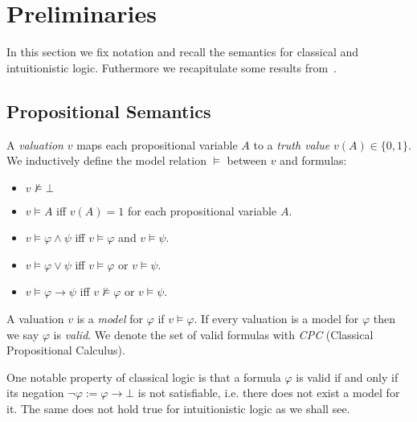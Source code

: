 \documentclass[runningheads]{llncs}
\begin{document}
\section{Preliminaries}

In this section we fix notation and recall the semantics for classical and intuitionistic logic. Futhermore we recapitulate some results from~\cite{otten2005clausal}.

\subsection{Propositional Semantics}

\begin{definition}
	A \emph{valuation} $v$ maps each propositional variable $A$ to a \emph{truth value} $v(A)\in\{0, 1\}$. We inductively define the model relation $\models$ between $v$ and formulas:
	\begin{itemize}
		\item $v\not\models \bot$
		\item $v\models A$ iff $v(A) = 1$ for each propositional variable $A$.
		\item $v\models \varphi\wedge\psi$ iff $v\models\varphi$ and $v\models\psi$.
		\item $v\models\varphi\vee\psi$ iff $v\models\varphi$ or $v\models\psi$.
		\item $v\models\varphi\to \psi$ iff $v\not\models\varphi$ or $v\models\psi$.
	\end{itemize}
	A valuation $v$ is a \emph{model} for $\varphi$ if $v\models\varphi$. If every valuation is a model for $\varphi$ then we say $\varphi$ is \emph{valid}. We denote the set of valid formulas with \emph{CPC} (Classical Propositional Calculus).
\end{definition}

One notable property of classical logic is that a formula $\varphi$ is valid if and only if its negation $\neg\varphi := \varphi\to\bot$ is not satisfiable, i.e. there does not exist a model for it. The same does not hold true for intuitionistic logic as we shall see.
\end{document}
